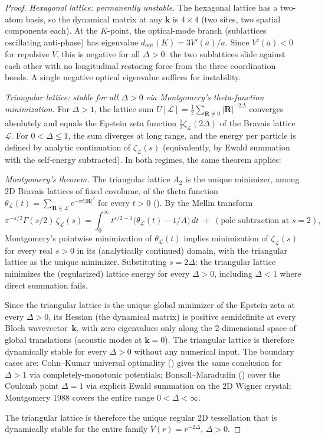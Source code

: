 \begin{proof}
\emph{Hexagonal lattice: permanently unstable.}
The hexagonal lattice has a two-atom basis, so the
dynamical matrix at any $\mathbf{k}$ is $4\times 4$
(two sites, two spatial components each).
At the $K$-point, the optical-mode branch
(sublattices oscillating anti-phase) has eigenvalue
$d_{\mathrm{opt}}(K) = 3 V'(a)/a$.
Since $V'(a) < 0$ for repulsive $V$, this is negative
for all $\Delta > 0$: the two sublattices slide against
each other with no longitudinal restoring force
from the three coordination bonds.
A single negative optical eigenvalue suffices for instability.

\emph{Triangular lattice: stable for all $\Delta > 0$
via Montgomery's theta-function minimization.}
For $\Delta > 1$, the lattice sum
$U[\mathcal{L}] = \tfrac{1}{2}\sum_{\mathbf{R} \ne 0}
|\mathbf{R}|^{-2\Delta}$
converges absolutely and equals the Epstein zeta function
$\tfrac{1}{2}\zeta_\mathcal{L}(2\Delta)$
of the Bravais lattice~$\mathcal{L}$.
For $0 < \Delta \le 1$, the sum diverges at long range,
and the energy per particle is defined by analytic
continuation of $\zeta_\mathcal{L}(s)$ (equivalently,
by Ewald summation with the self-energy subtracted).
In both regimes, the same theorem applies:

\emph{Montgomery's theorem.}
The triangular lattice $A_2$ is the unique minimizer,
among $2$D Bravais lattices of fixed covolume, of the
theta function $\theta_\mathcal{L}(t)
= \sum_{\mathbf{R} \in \mathcal{L}} e^{-\pi t|\mathbf{R}|^2}$
for every $t > 0$ (\citealt{Montgomery1988}).
By the Mellin transform
\[
  \pi^{-s/2}\Gamma(s/2)\,\zeta_\mathcal{L}(s)
  = \int_0^\infty t^{s/2 - 1}
  \bigl(\theta_\mathcal{L}(t) - 1/A\bigr)\,dt
  \;+\; (\text{pole subtraction at } s = 2),
\]
Montgomery's pointwise minimization of $\theta_\mathcal{L}(t)$
implies minimization of $\zeta_\mathcal{L}(s)$ for every
real $s > 0$ in its (analytically continued) domain, with
the triangular lattice as the unique minimizer.
Substituting $s = 2\Delta$: the triangular lattice minimizes
the (regularized) lattice energy for every $\Delta > 0$,
including $\Delta < 1$ where direct summation fails.

Since the triangular lattice is the unique global minimizer
of the Epstein zeta at every $\Delta > 0$, its Hessian (the
dynamical matrix) is positive semidefinite at every Bloch
wavevector~$\mathbf{k}$, with zero eigenvalues only along
the $2$-dimensional space of global translations (acoustic
modes at $\mathbf{k} = 0$).
The triangular lattice is therefore dynamically stable for
every $\Delta > 0$ without any numerical input.
The boundary cases are: Cohn--Kumar universal optimality
(\citealt{CohnKumar2007}) gives the same conclusion for
$\Delta > 1$ via completely-monotonic potentials;
Bonsall--Maradudin (\citeyear{BonsallMaradudin1977})
cover the Coulomb point $\Delta = 1$ via explicit Ewald
summation on the $2$D Wigner crystal; Montgomery 1988
covers the entire range $0 < \Delta < \infty$.

The triangular lattice is therefore the unique regular
$2$D tessellation that is dynamically stable for the
entire family $V(r) = r^{-2\Delta}$, $\Delta > 0$.
\end{proof}

